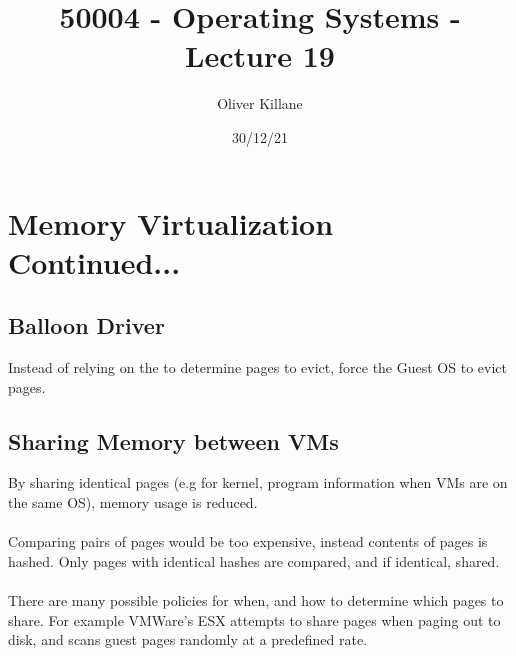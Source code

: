 \documentclass{report}
\title{50004 - Operating Systems - Lecture 19}
\author{Oliver Killane}
\date{30/12/21}
\begin{document}
\maketitle
{}

\section*{Memory Virtualization Continued...}
\subsection*{Balloon Driver}
Instead of relying on the  to determine pages to evict, force the Guest OS to evict pages.
\subsection*{Sharing Memory between VMs}
By sharing identical pages (e.g for kernel, program information when VMs are on the same OS), memory usage is reduced.
\\
\\ Comparing pairs of pages would be too expensive, instead contents of pages is hashed. Only pages with identical hashes are compared, and if identical, shared.
\\
\\ There are many possible policies for when, and how to determine which pages to share. For example VMWare's ESX attempts to share pages when paging out to disk, and scans guest pages randomly at a predefined rate.
\end{document}
